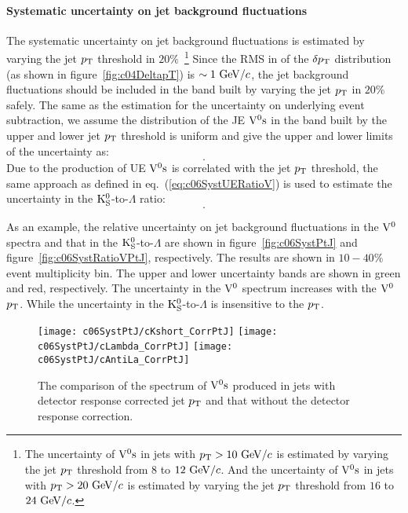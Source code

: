 \paragraph{Systematic uncertainty on jet background fluctuations}
The systematic uncertainty on jet background fluctuations is estimated by
varying the jet $p_{\rm T}$ threshold
in $20\%$~\footnote{The uncertainty of ${\rm V}^{0}{\rm s}$ in jets with $p_{\rm T}>10~{\rm GeV}/c$
is estimated by varying the jet $p_{\rm T}$ threshold from $8$ to $12~{\rm GeV}/c$.
And the uncertainty of ${\rm V}^{0}{\rm s}$ in jets with $p_{\rm T}>20~{\rm GeV}/c$
is estimated by varying the jet $p_{\rm T}$ threshold from $16$ to $24~{\rm GeV}/c$.}
Since the RMS in of the $\delta p_{\rm T}$ distribution (as shown
in figure~\ref{fig:c04DeltapT}) is $\sim 1~{\rm GeV}/c$,
the jet background fluctuations should be included in the band built by
varying the jet $p_{\rm T}$ in $20\%$ safely.
The same as the estimation for the uncertainty on underlying event subtraction,
we assume the distribution of the JE ${\rm V}^{0}{\rm s}$ in the band built by the upper
and lower jet $p_{\rm T}$ threshold is uniform and give the upper and lower limits
of the uncertainty as:
\begin{equation}
[\frac{{\rm JE}(\pT^{\rm jet}>(1-20\%)\pT^{\min})}{\sqrt{12}},
 \frac{{\rm JE}(\pT^{\rm jet}>(1+20\%)\pT^{\min})}{\sqrt{12}}].
\end{equation}
Due to the production of UE ${\rm V}^{0}{\rm s}$ is correlated with the
jet $p_{\rm T}$ threshold,
the same approach as defined in eq.~(\ref{eq:c06SystUERatioV}) is used to
estimate the uncertainty in the ${\rm K}_{\rm S}^{0}$-to-$\Lambda$ ratio:
\begin{equation}
[\frac{R_{{\rm K}/\Lambda}^{\rm JE}(\pT^{\rm jet}>(1-20\%)\pT^{\min})}
      {\sqrt{12}},
 \frac{R_{{\rm K}/\Lambda}^{\rm JE}(\pT^{\rm jet}>(1+20\%)\pT^{\min})}
      {\sqrt{12}}].
\end{equation}

As an example,
the relative uncertainty on jet background fluctuations in the ${\rm V}^{0}$ spectra
and that in the ${\rm K}_{\rm S}^{0}$-to-$\Lambda$ are shown in
figure~\ref{fig:c06SystPtJ} and
figure~\ref{fig:c06SystRatioVPtJ}, respectively.
The results are shown in $10-40\%$ event multiplicity bin.
The upper and lower uncertainty bands are shown in green and red, respectively.
The uncertainty in the ${\rm V}^{0}$ spectrum increases with the ${\rm V}^{0}$ $p_{\rm T}$.
While the uncertainty in the ${\rm K}_{\rm S}^{0}$-to-$\Lambda$ is insensitive to the $p_{\rm T}$.

\begin{figure}[htb]
\begin{center}
\texttt{[image: c06SystPtJ/cKshort\_CorrPtJ]}
\texttt{[image: c06SystPtJ/cLambda\_CorrPtJ]}
\texttt{[image: c06SystPtJ/cAntiLa\_CorrPtJ]}
\caption{The comparison of the spectrum of ${\rm V}^{0}{\rm s}$ produced in jets with
         detector response corrected jet $p_{\rm T}$ and that without the detector
         response correction.}
\label{fig:c06SystDetResp}
\end{center}
\end{figure}

